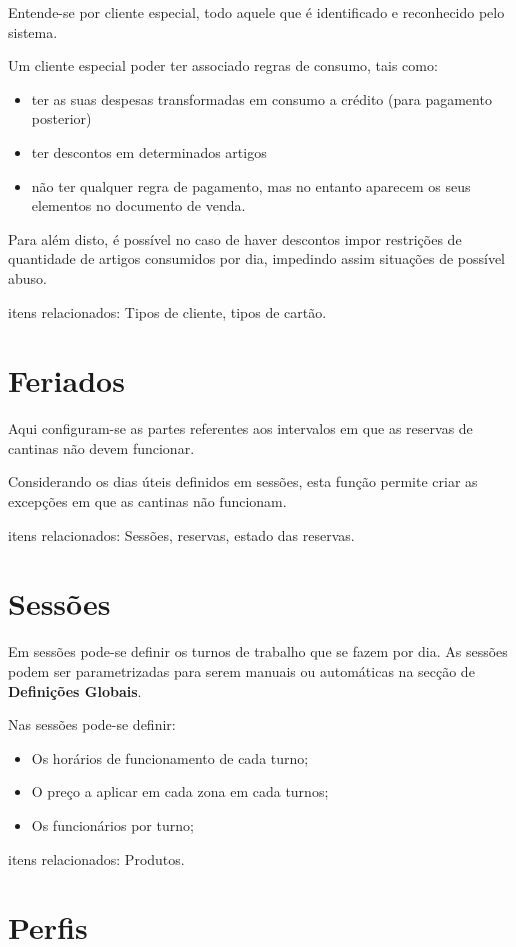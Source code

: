 \documentclass[a4paper,11pt,openany]{memoir}
\begin{document}
Entende-se por cliente especial, todo aquele que é identificado e reconhecido pelo sistema. 

Um cliente especial poder ter associado regras de consumo, tais como:
\begin{itemize}
\item ter as suas despesas transformadas em consumo a crédito (para pagamento posterior)
\item ter descontos em determinados artigos
\item não ter qualquer regra de pagamento, mas no entanto aparecem os seus elementos no documento de venda.
\end{itemize}

Para além disto, é possível no caso de haver descontos impor restrições de quantidade de artigos consumidos
por dia, impedindo assim situações de possível abuso.

itens relacionados: Tipos de cliente, tipos de cartão.

\section{Feriados}

Aqui configuram-se as partes referentes aos intervalos em que as reservas de cantinas não devem funcionar.

Considerando os dias úteis definidos em sessões, esta função permite criar as excepções em que as cantinas não funcionam.

itens relacionados: Sessões, reservas, estado das reservas.

\section{Sessões}
Em sessões pode-se definir os turnos de trabalho que se fazem por dia. As sessões podem ser parametrizadas para serem manuais ou automáticas 
na secção de \textbf{Definições Globais}.

Nas sessões pode-se definir:
\begin{itemize}
\item Os horários de funcionamento de cada turno;
\item O preço a aplicar em cada zona em cada turnos;
\item Os funcionários por turno;
\end{itemize}

itens relacionados: Produtos.


\section{Perfis}
\end{document}
